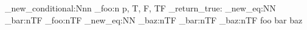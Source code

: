 \prg_new_conditional:Nnn
  \module_foo:n
  { p, T, F, TF }
  { \prg_return_true: }
\cs_new_eq:NN
  \module_bar:nTF
  \module_foo:nTF
\cs_new_eq:NN
  \module_baz:nTF
  \module_bar:nTF
\module_baz:nTF
  { foo }
  { bar }
  { baz }
